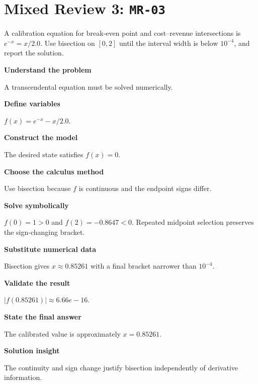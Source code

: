 \documentclass[11pt]{book}
\newcommand{\pid}[1]{\texttt{#1}}
\begin{document}
\section*{Mixed Review 3: \pid{MR-03}}
\begin{problembox}A calibration equation for break-even point and cost–revenue intersections is $e^{-x}=x/2.0$. Use bisection on $[0,2]$ until the interval width is below $10^{-4}$, and report the solution.\end{problembox}
\begin{solutionbox}
\textbf{Understand the problem}\par A transcendental equation must be solved numerically.\par\medskip
\textbf{Define variables}\par $f(x)=e^{-x}-x/2.0$.\par\medskip
\textbf{Construct the model}\par The desired state satisfies $f(x)=0$.\par\medskip
\textbf{Choose the calculus method}\par Use bisection because $f$ is continuous and the endpoint signs differ.\par\medskip
\textbf{Solve symbolically}\par $f(0)=1>0$ and $f(2)=-0.8647<0$. Repeated midpoint selection preserves the sign-changing bracket.\par\medskip
\textbf{Substitute numerical data}\par Bisection gives $x\approx 0.85261$ with a final bracket narrower than $10^{-4}$.\par\medskip
\textbf{Validate the result}\par $|f(0.85261)|\approx 6.66e-16$.\par\medskip
\textbf{State the final answer}\par The calibrated value is approximately $x=0.85261$.\par\medskip
\textbf{Solution insight}\par The continuity and sign change justify bisection independently of derivative information.\par\medskip
\end{solutionbox}
\end{document}
